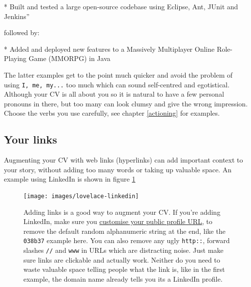 \documentclass[
]{book}
\newenvironment{Shaded}{\begin{snugshade}}{\end{snugshade}}
\newcommand{\NormalTok}[1]{#1}
\newcommand{\SpecialStringTok}[1]{\textcolor[rgb]{0.31,0.60,0.02}{#1}}
\begin{document}
\begin{Shaded}
\begin{Highlighting}[]
\SpecialStringTok{* }\NormalTok{Built and tested a large open{-}source codebase using Eclipse, Ant, JUnit and Jenkins”}
\end{Highlighting}
\end{Shaded}

followed by:

\begin{Shaded}
\begin{Highlighting}[]
\SpecialStringTok{* }\NormalTok{Added and deployed new features to a Massively Multiplayer Online Role{-}Playing Game (MMORPG) in Java}
\end{Highlighting}
\end{Shaded}

The latter examples get to the point much quicker and avoid the problem of using \texttt{I,\ me,\ my...} too much which can sound self-centred and egotistical. Although your CV is all about you so it is natural to have a few personal pronouns in there, but too many can look clumsy and give the wrong impression. Choose the verbs you use carefully, see chapter \ref{actioning} for examples.

\hypertarget{links}{%
\subsection{Your links}\label{links}}

Augmenting your CV with web links (hyperlinks) can add important context to your story, without adding too many words or taking up valuable space. An example using LinkedIn is shown in figure \ref{fig:lovelace-fig}

\begin{figure}

{\centering \texttt{[image: images/lovelace-linkedin]} 

}

\caption{Adding links is a good way to augment your CV. If you're adding LinkedIn, make sure you \href{https://www.linkedin.com/help/linkedin/topics/6042/6054/87}{customise your public profile URL}, to remove the default random alphanumeric string at the end, like the \texttt{038b37} example here. \citep{customlinkedin} You can also remove any ugly \texttt{http::}, forward slashes \texttt{//} and \texttt{www} in URLs which are distracting noise. Just make sure links are clickable and actually work. Neither do you need to waste valuable space telling people what the link is, like in the first example, the domain name already tells you its a LinkedIn profile.}\label{fig:lovelace-fig}
\end{figure}
\end{document}
